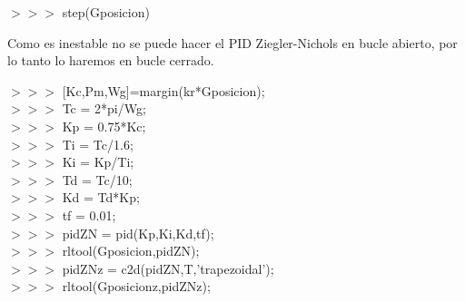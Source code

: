 \begin{tcolorbox}[sharp corners, colframe=bluebox, title= Método de
Ziegler-Nichols, breakable=unlimited]
 $>>>$ step(Gposicion)
  \vspace*{0.35em}

Como es inestable no se puede hacer el PID Ziegler-Nichols en bucle
abierto, por lo tanto lo haremos en bucle cerrado.

$>>>$ [Kc,Pm,Wg]=margin(kr*Gposicion);\\
$>>>$ Tc = 2*pi/Wg;\\
$>>>$ Kp = 0.75*Kc;\\
$>>>$ Ti = Tc/1.6;\\
$>>>$ Ki = Kp/Ti;\\
$>>>$ Td = Tc/10;\\
$>>>$ Kd = Td*Kp;\\
$>>>$ tf = 0.01;\\
$>>>$ pidZN = pid(Kp,Ki,Kd,tf);\\
$>>>$ rltool(Gposicion,pidZN);\\
$>>>$ pidZNz = c2d(pidZN,T,'trapezoidal');\\
$>>>$ rltool(Gposicionz,pidZNz);\\


\end{tcolorbox}

